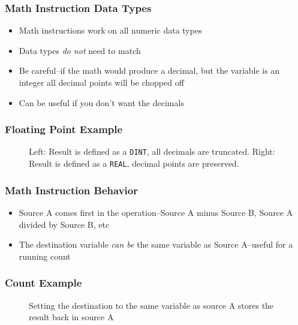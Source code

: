 \begin{frame}
    \frametitle{Math Instruction Data Types}

    \begin{itemize}
        \item Math instructions work on all numeric data types
        \item Data types \emph{do not} need to match
        \item Be careful--if the math would produce a decimal, but the variable is an integer all decimal points will be chopped off
        \item Can be useful if you don't want the decimals
    \end{itemize}
\end{frame}

\begin{frame}
    \frametitle{Floating Point Example}

    \begin{figure}
        \centering
        

        \vspace{0.5em}
        {\footnotesize Left: Result is defined as a \texttt{DINT}, all decimals are truncated. Right: Result is defined as a \texttt{REAL}, decimal points are preserved.\par}
    \end{figure}
\end{frame}

\begin{frame}
    \frametitle{Math Instruction Behavior}

    \begin{itemize}
        \item Source A comes first in the operation--Source A minus Source B, Source A divided by Source B, etc
        \item The destination variable \emph{can be} the same variable as Source A--useful for a running count
    \end{itemize}
\end{frame}

\begin{frame}
    \frametitle{Count Example}

    \begin{figure}
        \centering
        

        \vspace{0.5em}
        {\footnotesize Setting the destination to the same variable as source A stores the result back in source A\par}
    \end{figure}
\end{frame}

